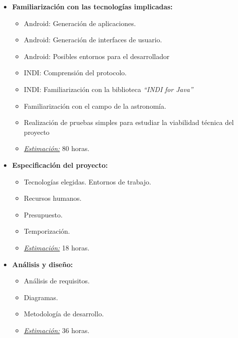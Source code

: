 \begin{itemize}
   \item \textbf{Familiarización con las tecnologías implicadas:}
   \begin{itemize}
    \item Android: Generación de aplicaciones.
    \item Android: Generación de interfaces de usuario.
    \item Android: Posibles entornos para el desarrollador
    \item INDI: Comprensión del protocolo.
    \item INDI: Familiarización con la biblioteca \textit{``INDI for Java''}
    \item Familiarización con el campo de la astronomía.
    \item Realización de pruebas simples para estudiar la viabilidad técnica del proyecto
    \item \underline{\textit{Estimación:}} 80 horas.
   \end{itemize}
\end{itemize}

\begin{itemize}
   \item \textbf{Especificación del proyecto:}
   \begin{itemize}
    \item Tecnologías elegidas. Entornos de trabajo.
    \item Recursos humanos.
    \item Presupuesto.
    \item Temporización.
    \item \underline{\textit{Estimación:}} 18 horas.
   \end{itemize}
\end{itemize}

\begin{itemize}
   \item \textbf{Análisis y diseño:}
   \begin{itemize}
    \item Análisis de requisitos.
    \item Diagramas.
    \item Metodología de desarrollo.
    \item \underline{\textit{Estimación:}} 36 horas.
   \end{itemize}
\end{itemize}

